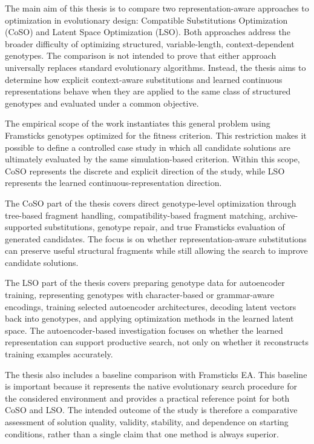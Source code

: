 
The main aim of this thesis is to compare two representation-aware approaches to optimization in evolutionary design: Compatible Substitutions Optimization (CoSO) and Latent Space Optimization (LSO). Both approaches address the broader difficulty of optimizing structured, variable-length, context-dependent genotypes. The comparison is not intended to prove that either approach universally replaces standard evolutionary algorithms. Instead, the thesis aims to determine how explicit context-aware substitutions and learned continuous representations behave when they are applied to the same class of structured genotypes and evaluated under a common objective.

The empirical scope of the work instantiates this general problem using Framsticks \fone{} genotypes optimized for the \vertpos{} fitness criterion. This restriction makes it possible to define a controlled case study in which all candidate solutions are ultimately evaluated by the same simulation-based criterion. Within this scope, CoSO represents the discrete and explicit direction of the study, while LSO represents the learned continuous-representation direction.

The CoSO part of the thesis covers direct genotype-level optimization through tree-based fragment handling, compatibility-based fragment matching, archive-supported substitutions, genotype repair, and true Framsticks evaluation of generated candidates. The focus is on whether representation-aware substitutions can preserve useful structural fragments while still allowing the search to improve candidate solutions.

The LSO part of the thesis covers preparing \fone{} genotype data for autoencoder training, representing genotypes with character-based or grammar-aware encodings, training selected autoencoder architectures, decoding latent vectors back into \fone{} genotypes, and applying optimization methods in the learned latent space. The autoencoder-based investigation focuses on whether the learned representation can support productive search, not only on whether it reconstructs training examples accurately.

The thesis also includes a baseline comparison with Framsticks EA. This baseline is important because it represents the native evolutionary search procedure for the considered environment and provides a practical reference point for both CoSO and LSO. The intended outcome of the study is therefore a comparative assessment of solution quality, validity, stability, and dependence on starting conditions, rather than a single claim that one method is always superior.


